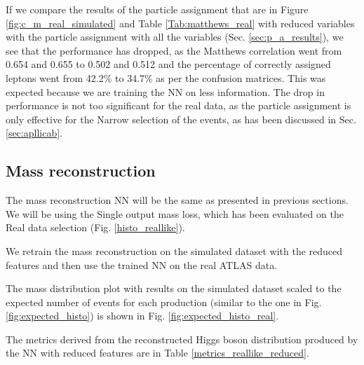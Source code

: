 \documentclass{ctuthesis}
\begin{document}
If we compare the results of the particle assignment that are in Figure \ref{fig:c_m_real_simulated} and Table \ref{Tab:matthews_real} with reduced variables with the particle assignment with all the variables (Sec. \ref{sec:p_a_results}), we see that the performance has dropped, as the Matthews correlation went from 0.654 and 0.655 to 0.502 and 0.512 and the percentage of correctly assigned leptons went from 42.2\% to 34.7\% as per the confusion matrices. This was expected because we are training the NN on less information. The drop in performance is not too significant for the real data, as the particle assignment is only effective for the Narrow selection of the events, as has been discussed in Sec. \ref{sec:apllicab}.

\subsection{Mass reconstruction}

The mass reconstruction NN will be the same as presented in previous sections. We will be using the Single output mass loss, which has been evaluated on the Real data selection (Fig. \ref{histo_reallike}).

We retrain the mass reconstruction on the simulated dataset with the reduced features and then use the trained NN on the real ATLAS data.

The mass distribution plot with results on the simulated dataset scaled to the expected number of events for each production (similar to the one in Fig. \ref{fig:expected_histo}) is shown in Fig. \ref{fig:expected_histo_real}.

\begin{figure}[h]
\end{figure}

The metrics derived from the reconstructed Higgs boson distribution produced by the NN with reduced features are in Table \ref{metrics_reallike_reduced}.
\end{document}
